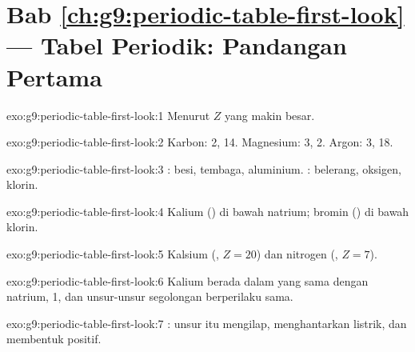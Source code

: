 \section*{Bab \ref{ch:g9:periodic-table-first-look} --- Tabel Periodik: Pandangan Pertama}

\begin{solution}{exo:g9:periodic-table-first-look:1}
Menurut  $Z$ yang makin besar.
\end{solution}

\begin{solution}{exo:g9:periodic-table-first-look:2}
Karbon:  2,  14. Magnesium:  3,  2.
Argon:  3,  18.
\end{solution}

\begin{solution}{exo:g9:periodic-table-first-look:3}
: besi, tembaga, aluminium. : belerang, oksigen, klorin.
\end{solution}

\begin{solution}{exo:g9:periodic-table-first-look:4}
Kalium () di bawah natrium; bromin () di bawah klorin.
\end{solution}

\begin{solution}{exo:g9:periodic-table-first-look:5}
Kalsium (, $Z = 20$) dan nitrogen (, $Z = 7$).
\end{solution}

\begin{solution}{exo:g9:periodic-table-first-look:6}
Kalium berada dalam  yang sama dengan natrium,  1, dan
unsur-unsur segolongan berperilaku sama.
\end{solution}

\begin{solution}{exo:g9:periodic-table-first-look:7}
: unsur itu mengilap, menghantarkan listrik, dan membentuk 
positif.
\end{solution}

